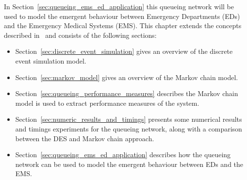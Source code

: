 In Section~\ref{sec:queueing_ems_ed_application} this queueing network will be
used to model the emergent behaviour between
Emergency Departments (EDs) and the Emergency Medical Systems (EMS).
This chapter extends the concepts described in~\cite{panayides2023game} and
consists of the following sections:

\begin{itemize}
    \item Section~\ref{sec:discrete_event_simulation} gives an overview of
    the discrete event simulation model.
    \item Section~\ref{sec:markov_model} gives an overview of the Markov
    chain model.
    \item Section~\ref{sec:queueing_performance_measures} describes the Markov
    chain model is used to extract performance measures of the system.
    \item Section~\ref{sec:numeric_results_and_timings} presents some numerical
    results and timings experiments for the queueing network, along with
    a comparison between the DES and Markov chain approach.
    \item Section~\ref{sec:queueing_ems_ed_application} describes how the
    queueing network can be used to model the emergent behaviour between
    EDs and the EMS.
\end{itemize}












